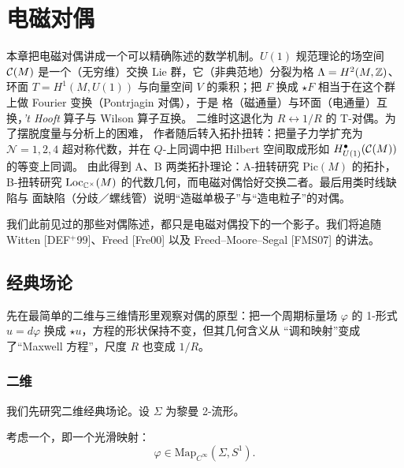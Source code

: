 \chapter{电磁对偶}\label{ch:04}

\begin{keytakeaways}
本章把电磁对偶讲成一个可以精确陈述的数学机制。$U(1)$ 规范理论的场空间
$\mathcal{C}(M)$ 是一个（无穷维）交换 Lie 群，它（非典范地）分裂为格
$\Lambda=H^{2}(M,\mathbb{Z})$、环面 $T=H^{1}(M,U(1))$ 与向量空间 $V$ 的乘积；把
$F$ 换成 $\star F$ 相当于在这个群上做 Fourier 变换（Pontrjagin 对偶），于是
格（磁通量）与环面（电通量）互换，\emph{'t Hooft} 算子与 Wilson 算子互换。
二维时这退化为 $R\leftrightarrow 1/R$ 的 T-对偶。为了摆脱度量与分析上的困难，
作者随后转入拓扑扭转：把量子力学扩充为 $\mathcal{N}=1,2,4$ 超对称代数，并在
$Q$-上同调中把 Hilbert 空间取成形如 $H^{\bullet}_{U(1)}(\mathcal{C}(M))$ 的等变上同调。
由此得到 A、B 两类拓扑理论：A-扭转研究 $\mathrm{Pic}(M)$ 的拓扑，B-扭转研究
$\mathrm{Loc}_{\mathbb{C}^{\times}}(M)$ 的代数几何，而电磁对偶恰好交换二者。最后用类时线缺陷与
面缺陷（分歧／螺线管）说明“造磁单极子”与“造电粒子”的对偶。
\end{keytakeaways}

我们此前见过的那些对偶陈述，都只是电磁对偶投下的一个影子。我们将追随
Witten [DEF$^{+}$99]、Freed [Fre00] 以及 Freed--Moore--Segal [FMS07] 的讲法。

\section{经典场论}
\begin{sectionkey}
先在最简单的二维与三维情形里观察对偶的原型：把一个周期标量场 $\varphi$ 的
1-形式 $u=d\varphi$ 换成 $\star u$，方程的形状保持不变，但其几何含义从
“调和映射”变成了“Maxwell 方程”，尺度 $R$ 也变成 $1/R$。
\end{sectionkey}

\subsection{二维}
\label{sec:4-1-1}

我们先研究二维经典场论。设 $\Sigma$ 为黎曼 2-流形。

考虑一个，即一个光滑映射：
\begin{equation}\tag{4.1}
\varphi\in \mathrm{Map}_{C^{\infty}}(\Sigma,S^{1}).
\end{equation}

